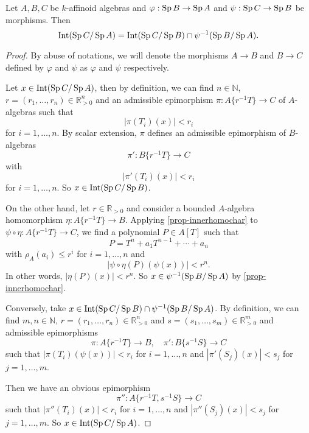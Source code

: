 \begin{proposition}\label{prop-intcomposition}
    Let $A,B,C$ be $k$-affinoid algebras and $\varphi:\operatorname{Sp} B\rightarrow \operatorname{Sp} A$ and $\psi:\operatorname{Sp} C\rightarrow \operatorname{Sp} B$ be morphisms. Then
    \[
        \operatorname{Int}(\operatorname{Sp} C/\operatorname{Sp} A)=\operatorname{Int}(\operatorname{Sp} C/\operatorname{Sp} B)\cap \psi^{-1}(\operatorname{Sp} B/\operatorname{Sp} A).
    \]
\end{proposition}
\begin{proof}
    By abuse of notations, we will denote the morphisms $A\rightarrow B$ and $B\rightarrow C$ defined by $\varphi$ and $\psi$ as $\varphi$ and $\psi$ respectively.

    Let $x\in \operatorname{Int}(\operatorname{Sp} C/\operatorname{Sp} A)$, then by definition, we can find $n\in \mathbb{N}$, $r=(r_1,\ldots,r_n)\in \mathbb{R}^n_{>0}$ and an admissible epimorphism $\pi : A\{r^{-1}T\}\rightarrow C$ of $A$-algebras such that
    \[
        |\pi(T_i)(x)|<r_i  
    \]
    for $i=1,\ldots,n$. By scalar extension, $\pi$ defines an admissible epimorphism of $B$-algebras
    \[
        \pi':  B\{r^{-1}T\}\rightarrow C
    \]
    with
    \[
        |\pi'(T_i)(x)|<r_i  
    \]
    for $i=1,\ldots,n$. So $x\in \operatorname{Int}(\operatorname{Sp} C/\operatorname{Sp} B)$. 
    
    On the other hand, let $r\in \mathbb{R}_{>0}$ and consider a bounded $A$-algebra homomorphism $\eta:A\{r^{-1}T\}\rightarrow B$. Applying \cref{prop-innerhomochar} to $\psi\circ\eta:A\{r^{-1}T\}\rightarrow C$, we find a polynomial $P\in A[T]$ such that
    \[
        P=T^n+a_1T^{n-1}+\cdots+a_n  
    \]
    with $\rho_A(a_i)\leq r^i$ for $i=1,\ldots,n$ and 
    \[
        |\psi\circ\eta(P)(\psi(x))|<r^n.  
    \]
    In other words, $|\eta(P)(x)|<r^n$. So $x\in \psi^{-1}(\operatorname{Sp} B/\operatorname{Sp} A)$ by \cref{prop-innerhomochar}.

    Conversely, take $x\in \operatorname{Int}(\operatorname{Sp} C/\operatorname{Sp} B)\cap \psi^{-1}(\operatorname{Sp} B/\operatorname{Sp} A)$. By definition, we can find $m,n\in \mathbb{N}$, $r=(r_1,\ldots,r_n)\in \mathbb{R}^n_{>0}$ and $s=(s_1,\ldots,s_m)\in \mathbb{R}^m_{>0}$ and admissible epimorphisms
    \[
        \pi:A\{r^{-1}T\}\rightarrow B,\quad \pi':B\{s^{-1}S\}\rightarrow C  
    \]
    such that $|\pi(T_i)(\psi(x))|<r_i$ for $i=1,\ldots,n$ and $|\pi'(S_j)(x)|<s_j$ for $j=1,\ldots,m$.

    Then we have an obvious epimorphism 
    \[
        \pi'':A\{r^{-1}T,s^{-1}S\} \rightarrow C 
    \]
     such that $|\pi''(T_i)(x)|<r_i$ for $i=1,\ldots,n$ and $|\pi''(S_j)(x)|<s_j$ for $j=1,\ldots,m$. So $x\in \operatorname{Int}(\operatorname{Sp} C/\operatorname{Sp} A)$.
\end{proof}


